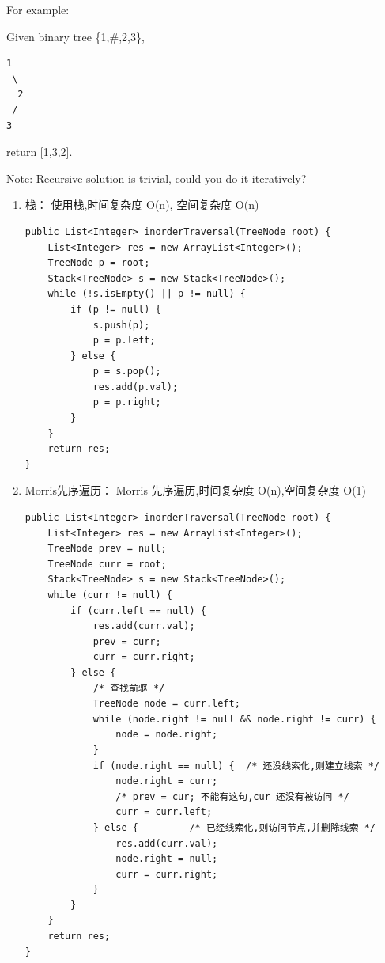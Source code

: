 \documentclass[12pt]{book}
\begin{document}
For example:

Given binary tree \{1,\#,2,3\},
\lstset{language=java,label= ,caption= ,numbers=none}
\begin{lstlisting}
1
 \
  2
 /
3
\end{lstlisting}

return [1,3,2].

Note: Recursive solution is trivial, could you do it iteratively?
\begin{enumerate}
\item 栈： 使用栈,时间复杂度 O(n), 空间复杂度 O(n)
\label{sec-4-2-2-1}

\lstset{language=java,label= ,caption= ,numbers=none}
\begin{lstlisting}
public List<Integer> inorderTraversal(TreeNode root) {
    List<Integer> res = new ArrayList<Integer>();
    TreeNode p = root;
    Stack<TreeNode> s = new Stack<TreeNode>();
    while (!s.isEmpty() || p != null) {
        if (p != null) {
            s.push(p);
            p = p.left;
        } else {
            p = s.pop();
            res.add(p.val);
            p = p.right;
        }
    }
    return res;
}
\end{lstlisting}

\item Morris先序遍历： Morris 先序遍历,时间复杂度 O(n),空间复杂度 O(1)
\label{sec-4-2-2-2}

\lstset{language=java,label= ,caption= ,numbers=none}
\begin{lstlisting}
public List<Integer> inorderTraversal(TreeNode root) {
    List<Integer> res = new ArrayList<Integer>();
    TreeNode prev = null;
    TreeNode curr = root;
    Stack<TreeNode> s = new Stack<TreeNode>();
    while (curr != null) {
        if (curr.left == null) {
            res.add(curr.val);
            prev = curr;
            curr = curr.right;
        } else {
            /* 查找前驱 */
            TreeNode node = curr.left;
            while (node.right != null && node.right != curr) {
                node = node.right;
            }
            if (node.right == null) {  /* 还没线索化,则建立线索 */
                node.right = curr;
                /* prev = cur; 不能有这句,cur 还没有被访问 */
                curr = curr.left;
            } else {         /* 已经线索化,则访问节点,并删除线索 */
                res.add(curr.val);
                node.right = null;
                curr = curr.right;
            }
        }
    }
    return res;
}
\end{lstlisting}
\end{enumerate}
\end{document}
